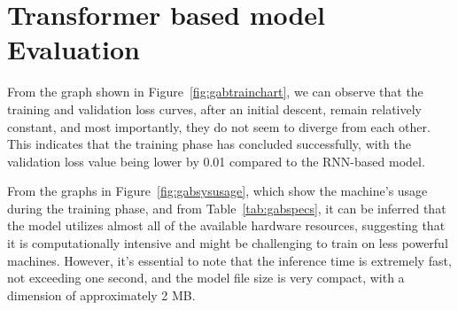 \section{Transformer based model Evaluation}
From the graph shown in Figure~\ref{fig:gabtrainchart}, we can observe that the training and validation loss curves, after an initial descent, remain relatively constant, and most importantly, they do not seem to diverge from each other. This indicates that the training phase has concluded successfully, with the validation loss value being lower by 0.01 compared to the RNN-based model.

From the graphs in Figure~\ref{fig:gabsysusage}, which show the machine's usage during the training phase, and from Table~\ref{tab:gabspecs}, it can be inferred that the model utilizes almost all of the available hardware resources, suggesting that it is computationally intensive and might be challenging to train on less powerful machines. However, it's essential to note that the inference time is extremely fast, not exceeding one second, and the model file size is very compact, with a dimension of approximately 2 MB.



